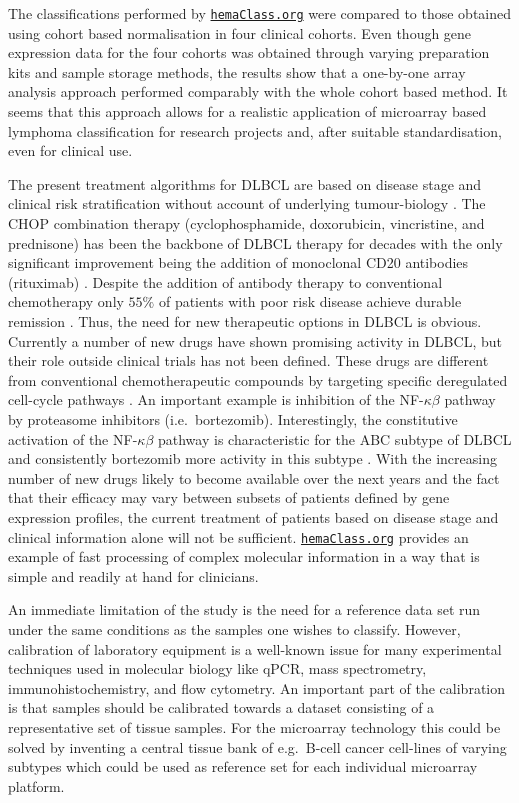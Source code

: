\documentclass{article}
\newcommand{\hemaClass}{\href{http://hemaClass.org}{\texttt{hemaClass.org}}}
\begin{document}
The classifications performed by \hemaClass{} were compared to those obtained using cohort based normalisation in four clinical cohorts.
Even though gene expression data for the four cohorts was obtained through varying preparation kits and sample storage methods, the results show that a one-by-one array analysis approach performed comparably with the whole cohort based method.
It seems that this approach allows for a realistic application of microarray based lymphoma classification for research projects and, after suitable standardisation, even for clinical use.

The present treatment algorithms for DLBCL are based on disease stage and clinical risk stratification without account of underlying tumour-biology \citep{Schmoll2012}.
The CHOP combination therapy (cyclophosphamide, doxorubicin, vincristine, and prednisone) has been the backbone of DLBCL therapy for decades with the only significant improvement being the addition of monoclonal CD20 antibodies (rituximab) \citep{Coiffier2002a}.
Despite the addition of antibody therapy to conventional chemotherapy only $55\%$ of patients with poor risk disease achieve durable remission \citep{Ziepert2010}.
Thus, the need for new therapeutic options in DLBCL is obvious.
Currently a number of new drugs have shown promising activity in DLBCL, but their role outside clinical trials has not been defined.
These drugs are different from conventional chemotherapeutic compounds by targeting specific deregulated cell-cycle pathways \citep{Friedberg2011}.
An important example is inhibition of the NF-$\kappa\beta$ pathway by proteasome inhibitors (i.e.\ bortezomib).
Interestingly, the constitutive activation of the NF-$\kappa\beta$ pathway is characteristic for the ABC subtype of DLBCL and consistently bortezomib more activity in this subtype \citep{Nogai2013}.
With the increasing number of new drugs likely to become available over the next years and the fact that their efficacy may vary between subsets of patients defined by gene expression profiles, the current treatment of patients based on disease stage and clinical information alone will not be sufficient.
\hemaClass{} provides an example of fast processing of complex molecular information in a way that is simple and readily at hand for clinicians.

An immediate limitation of the study is the need for a reference data set run under the same conditions as the samples one wishes to classify.
However, calibration of laboratory equipment is a well-known issue for many experimental techniques used in molecular biology like qPCR, mass spectrometry, immunohistochemistry, and flow cytometry.
An important part of the calibration is that samples should be calibrated towards a dataset consisting of a representative set of tissue samples.
For the microarray technology this could be solved by inventing a central tissue bank of e.g.\ B-cell cancer cell-lines of varying subtypes which could be used as reference set for each individual microarray platform.
\end{document}
